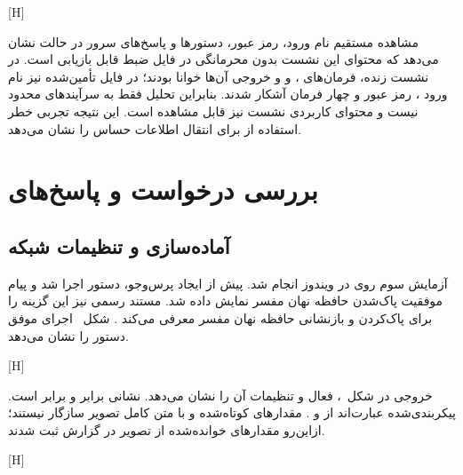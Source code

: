 [H]

مشاهده مستقیم نام ورود، رمز عبور، دستورها و پاسخ‌های سرور در حالت  نشان می‌دهد که
محتوای این نشست بدون محرمانگی در فایل ضبط قابل بازیابی است. در نشست زنده، فرمان‌های
،  و  و خروجی آن‌ها خوانا بودند؛ در فایل تأمین‌شده نیز نام ورود
، رمز عبور  و چهار فرمان  آشکار شدند. بنابراین تحلیل فقط به
سرآیندهای  محدود نیست و محتوای کاربردی نشست نیز قابل مشاهده است. این نتیجه تجربی خطر
استفاده از  برای انتقال اطلاعات حساس را نشان می‌دهد.

\section{بررسی درخواست و پاسخ‌های }

\subsection{آماده‌سازی و تنظیمات شبکه}

آزمایش سوم روی  در ویندوز انجام شد. پیش از ایجاد پرس‌وجو،
دستور  اجرا شد و پیام موفقیت پاک‌شدن حافظه نهان
مفسر
 نمایش داده شد. مستند رسمی  نیز این گزینه را برای پاک‌کردن و بازنشانی
حافظه نهان مفسر معرفی می‌کند . شکل~ اجرای موفق دستور را
نشان می‌دهد.

[H]

خروجی  در شکل~،  فعال و تنظیمات آن را
نشان می‌دهد. نشانی  برابر  و 
برابر  است. 
پیکربندی‌شده عبارت‌اند از
 و . مقدارهای کوتاه‌شده
 و  با متن کامل تصویر سازگار نیستند؛
ازاین‌رو مقدارهای خوانده‌شده از تصویر در گزارش ثبت شدند.

[H]

